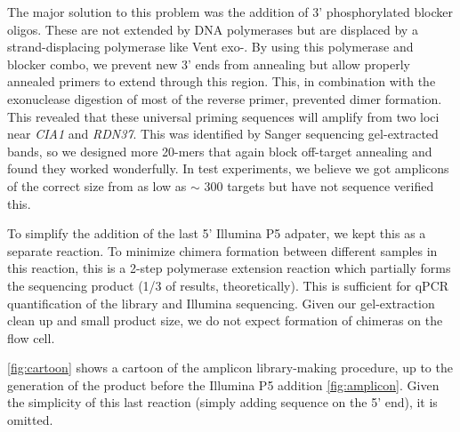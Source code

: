 The major solution to this problem was the addition of 3' phosphorylated
blocker oligos. These are not extended by DNA polymerases but are
displaced by a strand-displacing polymerase like Vent exo-. By using
this polymerase and blocker combo, we prevent new 3' ends from annealing
but allow properly annealed primers to extend through this region. This,
in combination with the exonuclease digestion of most of the reverse
primer, prevented dimer formation. This revealed that these universal
priming sequences will amplify from two loci near \emph{CIA1} and
\emph{RDN37}. This was identified by Sanger sequencing gel-extracted
bands, so we designed more 20-mers that again block off-target annealing
and found they worked wonderfully. In test experiments, we believe we
got amplicons of the correct size from as low as \(\sim\) 300 targets
but have not sequence verified this.

To simplify the addition of the last 5' Illumina P5 adpater, we kept
this as a separate reaction. To minimize chimera formation between
different samples in this reaction, this is a 2-step polymerase
extension reaction which partially forms the sequencing product (1/3 of
results, theoretically). This is sufficient for qPCR quantification of
the library and Illumina sequencing. Given our gel-extraction clean up
and small product size, we do not expect formation of chimeras on the
flow cell.

\autoref{fig:cartoon} shows a cartoon of
the amplicon library-making procedure, up to the generation of the
product before the Illumina P5 addition \autoref{fig:amplicon}. 
Given the simplicity of this
last reaction (simply adding sequence on the 5' end), it is omitted.


%  


